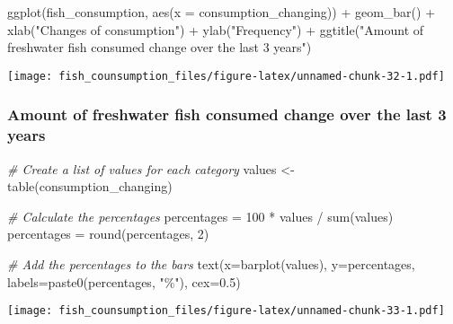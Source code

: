\documentclass[
]{article}
\newenvironment{Shaded}{\begin{snugshade}}{\end{snugshade}}
\newcommand{\AttributeTok}[1]{\textcolor[rgb]{0.77,0.63,0.00}{#1}}
\newcommand{\CommentTok}[1]{\textcolor[rgb]{0.56,0.35,0.01}{\textit{#1}}}
\newcommand{\DecValTok}[1]{\textcolor[rgb]{0.00,0.00,0.81}{#1}}
\newcommand{\FloatTok}[1]{\textcolor[rgb]{0.00,0.00,0.81}{#1}}
\newcommand{\FunctionTok}[1]{\textcolor[rgb]{0.00,0.00,0.00}{#1}}
\newcommand{\NormalTok}[1]{#1}
\newcommand{\OtherTok}[1]{\textcolor[rgb]{0.56,0.35,0.01}{#1}}
\newcommand{\SpecialCharTok}[1]{\textcolor[rgb]{0.00,0.00,0.00}{#1}}
\newcommand{\StringTok}[1]{\textcolor[rgb]{0.31,0.60,0.02}{#1}}
\begin{document}
\begin{Shaded}
\begin{Highlighting}[]
\FunctionTok{ggplot}\NormalTok{(fish\_consumption, }\FunctionTok{aes}\NormalTok{(}\AttributeTok{x =}\NormalTok{ consumption\_changing)) }\SpecialCharTok{+}
  \FunctionTok{geom\_bar}\NormalTok{() }\SpecialCharTok{+}
  \FunctionTok{xlab}\NormalTok{(}\StringTok{"Changes of consumption"}\NormalTok{) }\SpecialCharTok{+}
  \FunctionTok{ylab}\NormalTok{(}\StringTok{"Frequency"}\NormalTok{) }\SpecialCharTok{+}
  \FunctionTok{ggtitle}\NormalTok{(}\StringTok{"Amount of freshwater fish consumed change over the last 3 years"}\NormalTok{)}
\end{Highlighting}
\end{Shaded}

\texttt{[image: fish\_counsumption\_files/figure-latex/unnamed-chunk-32-1.pdf]}

\hypertarget{amount-of-freshwater-fish-consumed-change-over-the-last-3-years-1}{%
\subsubsection{Amount of freshwater fish consumed change over the last 3
years}\label{amount-of-freshwater-fish-consumed-change-over-the-last-3-years-1}}

\begin{Shaded}
\begin{Highlighting}[]
\CommentTok{\# Create a list of values for each category}
\NormalTok{values }\OtherTok{\textless{}{-}} \FunctionTok{table}\NormalTok{(consumption\_changing)}

\CommentTok{\# Calculate the percentages}
\NormalTok{percentages }\OtherTok{=} \DecValTok{100} \SpecialCharTok{*}\NormalTok{ values }\SpecialCharTok{/} \FunctionTok{sum}\NormalTok{(values)}
\NormalTok{percentages }\OtherTok{=} \FunctionTok{round}\NormalTok{(percentages, }\DecValTok{2}\NormalTok{)}

\CommentTok{\# Add the percentages to the bars}
\FunctionTok{text}\NormalTok{(}\AttributeTok{x=}\FunctionTok{barplot}\NormalTok{(values), }\AttributeTok{y=}\NormalTok{percentages, }\AttributeTok{labels=}\FunctionTok{paste0}\NormalTok{(percentages, }\StringTok{"\%"}\NormalTok{), }\AttributeTok{cex=}\FloatTok{0.5}\NormalTok{)}
\end{Highlighting}
\end{Shaded}

\texttt{[image: fish\_counsumption\_files/figure-latex/unnamed-chunk-33-1.pdf]}
\end{document}
